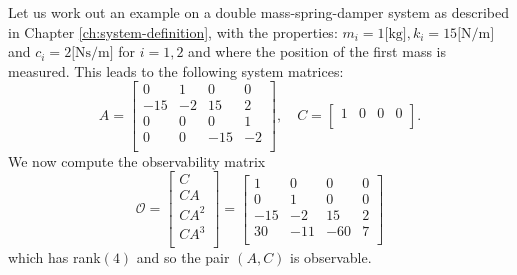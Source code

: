 \begin{example}\label{ex:single-ouptut-observability}
    Let us work out an example on a double mass-spring-damper system as described in Chapter \ref{ch:system-definition}, with the properties: $m_i=1 \text{[kg]}, k_i=15\text{[N/m]}$ and $c_i=2 \text{[Ns/m]}$ for $i=1,2$ and where the position of the first mass is measured. This leads to the following system matrices:
\begin{equation*}
    A =
    \begin{bmatrix}
        0 & 1 & 0 & 0 \\
        -15 & -2 & 15 & 2 \\
        0 & 0 & 0 & 1 \\
        0 & 0 & -15 & -2 \\
    \end{bmatrix}, \quad
    C =
    \begin{bmatrix}
        1 & 0 & 0 & 0 \\
    \end{bmatrix}.
\end{equation*}
We now compute the observability matrix
\begin{equation*}
    \mathcal{O} = 
    \begin{bmatrix}
        C \\ CA \\ CA^2 \\ CA^3 \\
    \end{bmatrix} =
    \begin{bmatrix}
        1 & 0 & 0 & 0 \\
        0 & 1 & 0 & 0 \\
        -15 & -2 & 15 & 2 \\
        30 & -11 & -60 & 7 \\
    \end{bmatrix}
\end{equation*}
which has rank$(4)$ and so the pair $(A,C)$ is observable.
\end{example}

